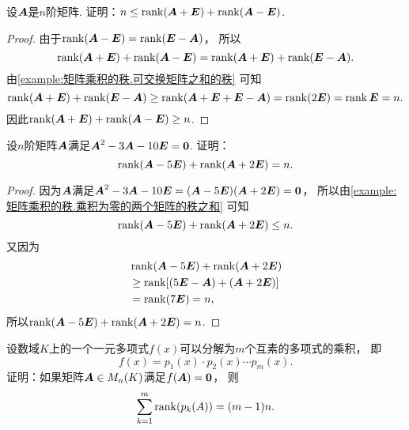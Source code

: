 \begin{example}\label{example:矩阵乘积的秩.矩阵的一次多项式的秩之和}
设\(\boldsymbol{A}\)是\(n\)阶矩阵.
证明：\(n \leq \rank(\boldsymbol{A} + \boldsymbol{E}) + \rank(\boldsymbol{A} - \boldsymbol{E})\).
\begin{proof}
由于\(\rank(\boldsymbol{A} - \boldsymbol{E}) = \rank(\boldsymbol{E} - \boldsymbol{A})\)，
所以\begin{equation*}
	\rank(\boldsymbol{A} + \boldsymbol{E}) + \rank(\boldsymbol{A} - \boldsymbol{E})
	= \rank(\boldsymbol{A} + \boldsymbol{E}) + \rank(\boldsymbol{E} - \boldsymbol{A}).
\end{equation*}
由\cref{example:矩阵乘积的秩.可交换矩阵之和的秩} 可知\begin{equation*}
	\rank(\boldsymbol{A} + \boldsymbol{E}) + \rank(\boldsymbol{E} - \boldsymbol{A})
	\geq \rank(\boldsymbol{A} + \boldsymbol{E} + \boldsymbol{E} - \boldsymbol{A})
	= \rank(2\boldsymbol{E})
	= \rank\boldsymbol{E}
	= n.
\end{equation*}
因此\(\rank(\boldsymbol{A} + \boldsymbol{E}) + \rank(\boldsymbol{A} - \boldsymbol{E}) \geq n\).
\end{proof}
\end{example}
\begin{example}\label{example:矩阵乘积的秩.矩阵的多项式的各个互素因式的秩之和}
设\(n\)阶矩阵\(\boldsymbol{A}\)满足\(\boldsymbol{A}^2 - 3 \boldsymbol{A} - 10 \boldsymbol{E} = \boldsymbol0\).
证明：\begin{equation*}
	\rank(\boldsymbol{A} - 5\boldsymbol{E}) + \rank(\boldsymbol{A} + 2\boldsymbol{E}) = n.
\end{equation*}
\begin{proof}
因为\(\boldsymbol{A}\)满足\(\boldsymbol{A}^2 - 3 \boldsymbol{A} - 10 \boldsymbol{E} = (\boldsymbol{A} - 5\boldsymbol{E})(\boldsymbol{A} + 2\boldsymbol{E}) = \boldsymbol0\)，
所以由\cref{example:矩阵乘积的秩.乘积为零的两个矩阵的秩之和} 可知\begin{equation*}
	\rank(\boldsymbol{A} - 5\boldsymbol{E}) + \rank(\boldsymbol{A} + 2\boldsymbol{E}) \leq n.
\end{equation*}
又因为\begin{align*}
	&\rank(\boldsymbol{A} - 5\boldsymbol{E}) + \rank(\boldsymbol{A} + 2\boldsymbol{E}) \\
	&\geq \rank[(5\boldsymbol{E} - \boldsymbol{A}) + (\boldsymbol{A} + 2\boldsymbol{E})] \\
	&= \rank(7\boldsymbol{E})
	= n,
\end{align*}
所以\(\rank(\boldsymbol{A} - 5\boldsymbol{E}) + \rank(\boldsymbol{A} + 2\boldsymbol{E}) = n\).
\end{proof}
\end{example}
\begin{example}
设数域\(K\)上的一个一元多项式\(f(x)\)可以分解为\(m\)个互素的多项式的乘积，
即\begin{equation*}
	f(x) = p_1(x) \cdot p_2(x) \dotsm p_m(x).
\end{equation*}
证明：如果矩阵\(\boldsymbol{A} \in M_n(K)\)满足\(f(\boldsymbol{A}) = \boldsymbol0\)，
则\begin{equation*}
	\sum_{k=1}^m \rank(p_k(A))
	= (m-1)n.
\end{equation*}
\end{example}

